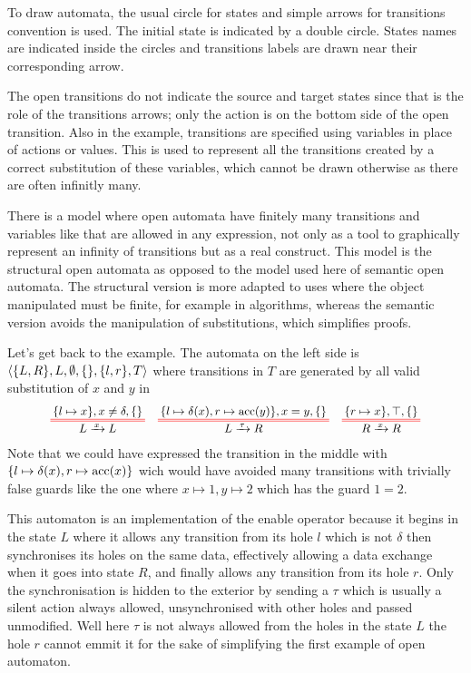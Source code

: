 \documentclass{article}
\begin{document}
\begin{exi}
To draw automata, the usual circle for states and simple arrows for transitions convention is used.
The initial state is indicated by a double circle.
States names are indicated inside the circles and transitions labels are drawn near their corresponding arrow.

The open transitions do not indicate the source and target states since that is the role of the transitions arrows; only the action is on the bottom side of the open transition.
Also in the example, transitions are specified using variables in place of actions or values.
This is used to represent all the transitions created by a correct substitution of these variables, which cannot be drawn otherwise as there are often infinitly many.

There is a model where open automata have finitely many transitions and variables like that are allowed in any expression, not only as a tool to graphically represent an infinity of transitions but as a real construct.
This model is the structural open automata as opposed to the model used here of semantic open automata.
The structural version is more adapted to uses where the object manipulated must be finite, for example in algorithms, whereas the semantic version avoids the manipulation of substitutions, which simplifies proofs.

Let's get back to the example.
The automata on the left side is \(\left<{\left\{L, R\right\}},L,\emptyset,{\left\{\right\}},{\left\{l, r\right\}},T\right>\) where transitions in \(T\) are generated by all valid substitution of \(x\) and \(y\) in
\begin{align*}
	\OT{L}{L}{x}{\mbrc{l \mapsto x}}{x \neq \delta}{\mbrc{}} &&
	\OT{L}{R}{\tau}{\mbrc{l \mapsto \delta\mpar{x}, r \mapsto \act{acc}\mpar{y}}}{x = y}{\mbrc{}} &&
	\OT{R}{R}{x}{\mbrc{r \mapsto x}}{\top}{\mbrc{}}
\end{align*}
Note that we could have expressed the transition in the middle with \({\left\{l \mapsto \delta{\left(x\right)}, r \mapsto \mathrm{acc}{\left(x\right)}\right\}}\) wich would have avoided many transitions with trivially false guards like the one where \(x \mapsto 1, y \mapsto 2\) which has the guard \(1 = 2\).

This automaton is an implementation of the enable operator because it begins in the state \(L\) where it allows any transition from its hole \(l\) which is not \(\delta\) then synchronises its holes on the same data, effectively allowing a data exchange when it goes into state \(R\), and finally allows any transition from its hole \(r\).
Only the synchronisation is hidden to the exterior by sending a \(\tau\) which is usually a silent action always allowed, unsynchronised with other holes and passed unmodified.
Well here \(\tau\) is not always allowed from the holes in the state \(L\) the hole \(r\) cannot emmit it for the sake of simplifying the first example of open automaton.
\end{exi}
\end{document}
